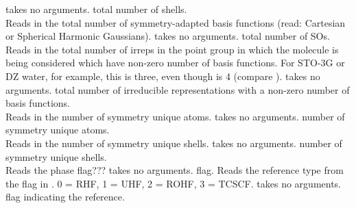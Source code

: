 {takes no arguments.}
{total number of shells.} \\
{Reads in the total number of symmetry-adapted basis functions (read:
Cartesian or Spherical Harmonic Gaussians).}
{takes no arguments.}
{total number of SOs.} \\
{Reads in the total number of irreps
in the point group in which the molecule is being considered which
have non-zero number of basis functions. For STO-3G or DZ water, for
example, this is three, even though  is 4 (compare
).}
{takes no arguments.}
{total number of irreducible representations
with a non-zero number of basis functions.} \\
{Reads in the number of symmetry unique atoms.}
{takes no arguments.}
{number of symmetry unique atoms.} \\
{Reads in the number of symmetry unique shells.}
{takes no arguments.}
{number of symmetry unique shells.} \\
{Reads the phase flag???}
{takes no arguments.}
{flag.}
{Reads the reference type from the flag in .
0 = RHF, 1 = UHF, 2 = ROHF, 3 = TCSCF.}
{takes no arguments.}
{flag indicating the reference.}

